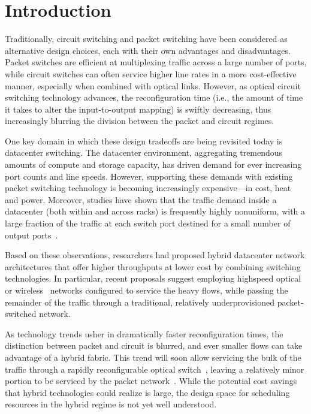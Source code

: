 \section{Introduction}

Traditionally, circuit switching and packet switching have been
considered as alternative design choices, each with their own advantages
and disadvantages. Packet switches are efficient at multiplexing traffic
across a large number of ports, while circuit switches can often service
higher line rates in a more cost-effective manner, especially when
combined with optical links. However, as optical circuit switching
technology advances, the reconfiguration time (i.e., the amount of time
it takes to alter the input-to-output mapping) is swiftly decreasing,
thus increasingly blurring the division between the packet and circuit
regimes.

One key domain in which these design tradeoffs are being revisited today
is datacenter switching. The datacenter environment, aggregating
tremendous amounts of compute and storage capacity, has driven demand
for ever increasing port counts and line speeds. However, supporting
these demands with existing packet switching technology is becoming
increasingly expensive—in cost, heat and power. Moreover, studies have
shown that the traffic demand inside a datacenter (both within and
across racks) is frequently highly nonuniform, with a large fraction of
the traffic at each switch port destined for a small number of output
ports~\cite{Kandula:2009-2}.

Based on these observations, researchers had proposed hybrid datacenter
network architectures that offer higher throughputs at lower cost by
combining switching technologies. In particular, recent proposals
suggest employing highspeed optical~\cite{Chen:2012, Farrington:2010,
Wang:2010} or wireless~\cite{Halperin:2011, Kandula:2009, Zhou:2012}
networks configured to service the heavy flows, while passing the
remainder of the traffic through a traditional, relatively
underprovisioned packet-switched network. 

As technology trends usher in dramatically faster reconfiguration times,
the distinction between packet and circuit is blurred, and ever smaller
flows can take advantage of a hybrid fabric. This trend will soon allow
servicing the bulk of the traffic through a rapidly reconfigurable
optical switch~\cite{Porter:2013}, leaving a relatively minor portion to
be serviced by the packet network~\cite{Liu:2014}. While the potential
cost savings that hybrid technologies could realize is large, the design
space for scheduling resources in the hybrid regime is not yet well
understood. 

